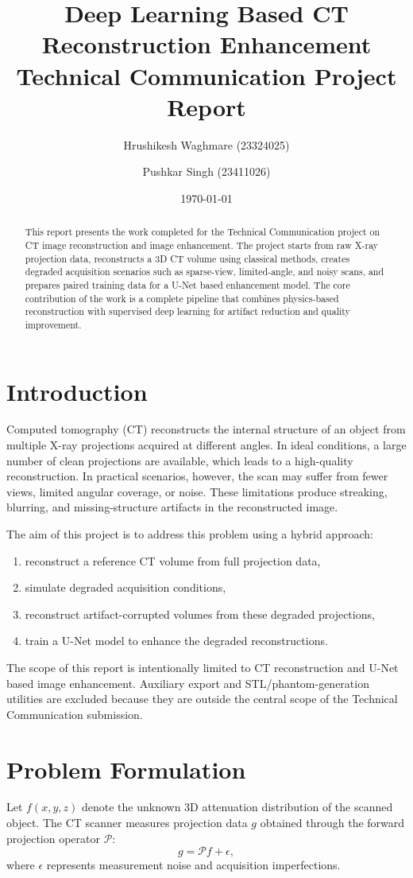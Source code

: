 \documentclass[12pt,a4paper]{article}
\title{\textbf{Deep Learning Based CT Reconstruction Enhancement}\\
Technical Communication Project Report}
\author{
Hrushikesh Waghmare (23324025) \and
Pushkar Singh (23411026)
}
\date{\today}
\begin{document}
\maketitle

\begin{abstract}
This report presents the work completed for the Technical Communication project on CT image reconstruction and image enhancement. The project starts from raw X-ray projection data, reconstructs a 3D CT volume using classical methods, creates degraded acquisition scenarios such as sparse-view, limited-angle, and noisy scans, and prepares paired training data for a U-Net based enhancement model. The core contribution of the work is a complete pipeline that combines physics-based reconstruction with supervised deep learning for artifact reduction and quality improvement.
\end{abstract}

\section{Introduction}
Computed tomography (CT) reconstructs the internal structure of an object from multiple X-ray projections acquired at different angles. In ideal conditions, a large number of clean projections are available, which leads to a high-quality reconstruction. In practical scenarios, however, the scan may suffer from fewer views, limited angular coverage, or noise. These limitations produce streaking, blurring, and missing-structure artifacts in the reconstructed image.

The aim of this project is to address this problem using a hybrid approach:
\begin{enumerate}[leftmargin=*]
\item reconstruct a reference CT volume from full projection data,
\item simulate degraded acquisition conditions,
\item reconstruct artifact-corrupted volumes from these degraded projections,
\item train a U-Net model to enhance the degraded reconstructions.
\end{enumerate}

The scope of this report is intentionally limited to CT reconstruction and U-Net based image enhancement. Auxiliary export and STL/phantom-generation utilities are excluded because they are outside the central scope of the Technical Communication submission.

\section{Problem Formulation}
Let $f(x,y,z)$ denote the unknown 3D attenuation distribution of the scanned object. The CT scanner measures projection data $g$ obtained through the forward projection operator $\mathcal{P}$:
\[
g = \mathcal{P}f + \epsilon,
\]
where $\epsilon$ represents measurement noise and acquisition imperfections.
\end{document}
